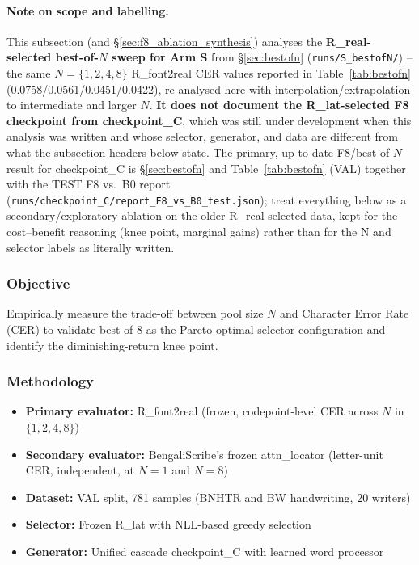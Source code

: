 \documentclass[10.5pt,a4paper]{article}
\newcommand{\fp}[1]{\nolinkurl{#1}}
\begin{document}
\paragraph{Note on scope and labelling.} This subsection (and \S\ref{sec:f8_ablation_synthesis}) analyses the
\textbf{R\_real-selected best-of-$N$ sweep for Arm S} from \S\ref{sec:bestofn} (\fp{runs/S\_bestofN/}) -- the same
$N{=}\{1,2,4,8\}$ R\_font2real CER values reported in Table~\ref{tab:bestofn} (0.0758/0.0561/0.0451/0.0422), re-analysed
here with interpolation/extrapolation to intermediate and larger $N$. \textbf{It does not document the R\_lat-selected F8
checkpoint from checkpoint\_C}, which was still under development when this analysis was written and whose selector,
generator, and data are different from what the subsection headers below state. The primary, up-to-date F8/best-of-$N$
result for checkpoint\_C is \S\ref{sec:bestofn} and Table~\ref{tab:bestofn} (VAL) together with the TEST F8 vs.\ B0 report
(\fp{runs/checkpoint\_C/report\_F8\_vs\_B0\_test.json}); treat everything below as a secondary/exploratory ablation on the
older R\_real-selected data, kept for the cost--benefit reasoning (knee point, marginal gains) rather than for the N and
selector labels as literally written.

\subsubsection{Objective}
Empirically measure the trade-off between pool size $N$ and Character Error Rate (CER) to validate best-of-8 as the Pareto-optimal selector configuration and identify the diminishing-return knee point.

\subsubsection{Methodology}
\begin{itemize}
    \item \textbf{Primary evaluator:} R\_font2real (frozen, codepoint-level CER across $N$ in $\{1, 2, 4, 8\}$)
    \item \textbf{Secondary evaluator:} BengaliScribe's frozen attn\_locator (letter-unit CER, independent, at $N{=}1$ and $N{=}8$)
    \item \textbf{Dataset:} VAL split, 781 samples (BNHTR and BW handwriting, 20 writers)
    \item \textbf{Selector:} Frozen R\_lat with NLL-based greedy selection
    \item \textbf{Generator:} Unified cascade checkpoint\_C with learned word processor
\end{itemize}
\end{document}
